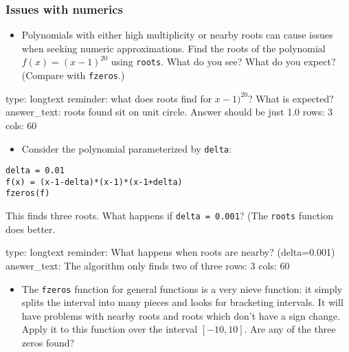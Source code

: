 \documentclass[12pt]{article}
\begin{document}
\subsubsection{Issues with numerics}

\begin{itemize}
\itemsep1pt\parskip0pt
\item
  Polynomials with either high multiplicity or nearby roots can cause
  issues when seeking numeric approximations. Find the roots of the
  polynomial $f(x) = (x-1)^20$ using \texttt{roots}. What do you see?
  What do you expect? (Compare with \texttt{fzeros}.)
\end{itemize}

\begin{answer}
type: longtext
reminder: what does roots find for \( x-1)^20 \)? What is expected?
answer_text: roots found sit on unit circle. Answer should be just 1.0 
rows: 3
cols: 60
\end{answer}

\begin{itemize}
\itemsep1pt\parskip0pt
\item
  Consider the polynomial parameterized by \texttt{delta}:
\end{itemize}



\begin{verbatim}
delta = 0.01
f(x) = (x-1-delta)*(x-1)*(x-1+delta)
fzeros(f)
\end{verbatim}
This finds three roots. What happens if \texttt{delta = 0.001}? (The
\texttt{roots} function does better.

\begin{answer}
type: longtext
reminder: What happens when roots are nearby? (delta=0.001)
answer_text: The algorithm only finds two of three 
rows: 3
cols: 60
\end{answer}

\begin{itemize}
\itemsep1pt\parskip0pt
\item
  The \texttt{fzeros} function for general functions is a very nieve
  function: it simply splits the interval into many pieces and looks for
  bracketing intervals. It will have problems with nearby roots and
  roots which don't have a sign change. Apply it to this function over
  the interval $[-10,10]$. Are any of the three zeros found?
\end{itemize}
\end{document}
